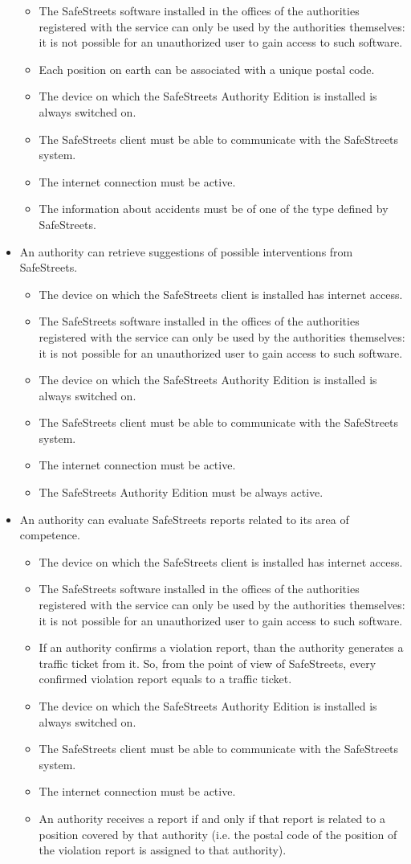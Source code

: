 \documentclass{article}
\newcommand\goal[1]{\item[{[G#1]}] }
\newcommand\requirement[1]{\item[{[R#1]}] }
\newcommand\assumption[1]{\item[{[A#1]}] }
\begin{document}
\begin{itemize}
\begin{itemize}
					\assumption{7} The SafeStreets software installed in the offices of the authorities registered with the service can only be used by the authorities themselves: it is not possible for an unauthorized user to gain access to such software.
					\assumption{8} Each position on earth can be associated with a unique postal code.
					\assumption{10} The device on which the SafeStreets Authority Edition is installed is always switched on.
				   \requirement{1} The SafeStreets client must be able to communicate with the SafeStreets system.
				   \requirement{2} The internet connection must be active.
				   \requirement{3} The information about accidents must be of one of the type defined by SafeStreets.
				\end{itemize}
				\goal{4}An authority can retrieve suggestions of possible interventions from SafeStreets.
				\begin{itemize}
					\assumption{1} The device on which the SafeStreets client is installed has internet access.
					\assumption{7} The SafeStreets software installed in the offices of the authorities registered with the service can only be used by the authorities 			themselves: it is not possible for an unauthorized user to gain access to such software.
					\assumption{10} The device on which the SafeStreets Authority Edition is installed is always switched on.
					\requirement{1} The SafeStreets client must be able to communicate with the SafeStreets system.
					\requirement{2} The internet connection must be active.
					\requirement{3} The SafeStreets Authority Edition must be always active.
				\end{itemize}
				\goal{5}An authority can evaluate SafeStreets reports related to its area of competence.
				\begin{itemize}
					\assumption{1} The device on which the SafeStreets client is installed has internet access.
					\assumption{7} The SafeStreets software installed in the offices of the authorities registered with the service can only be used by the authorities 			themselves: it is not possible for an unauthorized user to gain access to such software.
					\assumption{9} If an authority confirms a violation report, than the authority generates a traffic ticket from it. So, from the point of view of 				SafeStreets, every confirmed violation report equals to a traffic ticket.
					\assumption{10} The device on which the SafeStreets Authority Edition is installed is always switched on.
					\requirement{1} The SafeStreets client must be able to communicate with the SafeStreets system.
					\requirement{2} The internet connection must be active.
					\requirement{3} An authority receives a report if and only if that report is related to a position covered by that authority (i.e. the postal code of the position of the violation report is assigned to that authority).
				\end{itemize}
			\end{itemize}
		
\end{document}
